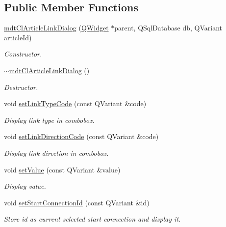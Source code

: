 \subsection*{Public Member Functions}
\begin{DoxyCompactItemize}
\item 
\hyperlink{classmdt_cl_article_link_dialog_a6543c22308fff67f98c9d42581a10de7}{mdt\-Cl\-Article\-Link\-Dialog} (\hyperlink{class_q_widget}{Q\-Widget} $\ast$parent, Q\-Sql\-Database db, Q\-Variant article\-Id)
\begin{DoxyCompactList}\small\item\em Constructor. \end{DoxyCompactList}\item 
\hyperlink{classmdt_cl_article_link_dialog_ab245318cbe47717ac42a57becfcf1688}{$\sim$mdt\-Cl\-Article\-Link\-Dialog} ()
\begin{DoxyCompactList}\small\item\em Destructor. \end{DoxyCompactList}\item 
void \hyperlink{classmdt_cl_article_link_dialog_a47d02d3d5a01dc5d2a764a68c376f0f4}{set\-Link\-Type\-Code} (const Q\-Variant \&code)
\begin{DoxyCompactList}\small\item\em Display link type in combobox. \end{DoxyCompactList}\item 
void \hyperlink{classmdt_cl_article_link_dialog_ae911aa98e97e83ea6691facbb9c4762d}{set\-Link\-Direction\-Code} (const Q\-Variant \&code)
\begin{DoxyCompactList}\small\item\em Display link direction in combobox. \end{DoxyCompactList}\item 
void \hyperlink{classmdt_cl_article_link_dialog_aa609d5af478e7103b138e9a6a245df53}{set\-Value} (const Q\-Variant \&value)
\begin{DoxyCompactList}\small\item\em Display value. \end{DoxyCompactList}\item 
void \hyperlink{classmdt_cl_article_link_dialog_a302a9c5f64407b4e3efd76c68b3a5cb2}{set\-Start\-Connection\-Id} (const Q\-Variant \&id)
\begin{DoxyCompactList}\small\item\em Store id as current selected start connection and display it. \end{DoxyCompactList}\item 

\end{DoxyCompactItemize}
